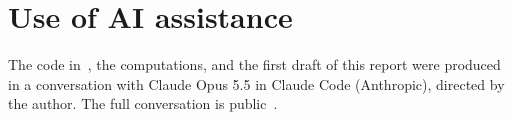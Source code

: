 \section*{Use of AI assistance}

The code in~\cite{repo}, the computations, and the first draft of this report were produced in a
conversation with Claude Opus 5.5 in Claude Code (Anthropic), directed by the author. The full
conversation is public~\cite{conversation}. 
